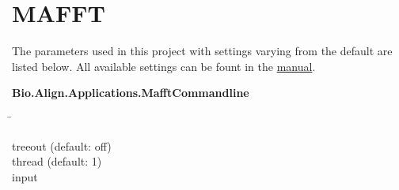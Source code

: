 \section{MAFFT} \label{sec:Clustering_Pipeline}

\blindtext
\autocite{katoh_mafft_2013}
\autocite{cock_biopython_2009}

The parameters used in this project with settings varying from the default are listed below. All available settings can be fount in the \href{https://mafft.cbrc.jp/alignment/software/}{manual}.

\begin{leftbar}
    \textbf{Bio.Align.Applications.MafftCommandline}
    \begin{nstabbing}
        \qquad\qquad\qquad\qquad\qquad\quad\=\kill
    
        treeout \> (default: off)\\
        
        thread \> (default: 1)\\
        
        input \>
        
    \end{nstabbing}
\end{leftbar}

